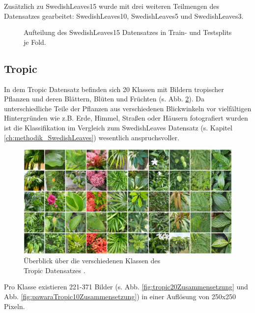 Zusätzlich zu SwedishLeaves15 wurde mit drei weiteren Teilmengen des Datensatzes gearbeitet: SwedishLeaves10, SwedishLeaves5 und SwedishLeaves3.

\begin{figure}[H]
\begin{adjustbox}{width=1.4\textwidth, center}

\end{adjustbox}
\caption{Aufteilung des SwedishLeaves15 Datensatzes \cite{swedishLeaves} in Train- und Testsplits je Fold.}
\label{fig:swedishLeavesZusammensetzung}
\end{figure}
\newpage
\subsection{Tropic}
\label{ch:methodik_Tropic}
In dem Tropic Datensatz \cite{pawaraWebsiteDatensaetze} befinden sich 20 Klassen mit Bildern tropischer Pflanzen und deren Blättern, Blüten und Früchten (s. Abb. \ref{fig:tropicUeberblick}). Da unterschiedliche Teile der Pflanzen aus verschiedenen Blickwinkeln vor vielfältigen Hintergründen wie z.B. Erde, Himmel, Straßen oder Häusern fotografiert wurden ist die Klassifikation im Vergleich zum SwedishLeaves Datensatz \cite{swedishLeaves} (s. Kapitel \ref{ch:methodik_SwedishLeaves}) wesentlich anspruchsvoller.


\begin{figure}[H]
\centering
\includegraphics[scale=0.14]{img/2_tropic10-image.jpg}
\caption{Überblick über die verschiedenen Klassen des\\
Tropic Datensatzes \cite{pawaraTropic}.}
\label{fig:tropicUeberblick}
\end{figure}

Pro Klasse existieren 221-371 Bilder (s. Abb. \ref{fig:tropic20Zusammensetzung} und Abb. \ref{fig:pawaraTropic10Zusammensetzung}) in einer Auflösung von 250x250 Pixeln.

